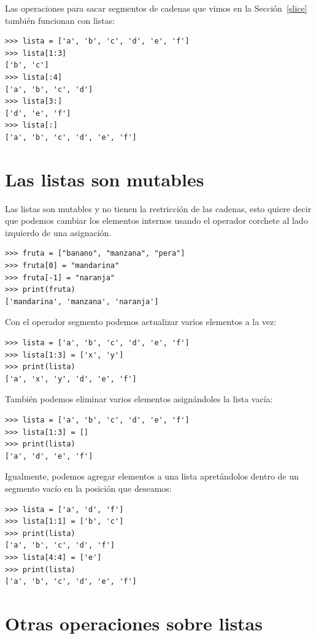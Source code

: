  

Las operaciones para sacar segmentos de cadenas que vimos en la Sección~\ref{slice}
también funcionan con listas:
\begin{verbatim}
>>> lista = ['a', 'b', 'c', 'd', 'e', 'f']
>>> lista[1:3]
['b', 'c']
>>> lista[:4]
['a', 'b', 'c', 'd']
>>> lista[3:]
['d', 'e', 'f']
>>> lista[:]
['a', 'b', 'c', 'd', 'e', 'f']
\end{verbatim}

\section{Las listas son mutables}

 

Las listas son mutables y no tienen la restricción de las cadenas,
esto quiere decir que podemos cambiar los elementos internos usando
el operador corchete al lado izquierdo de una asignación.
\begin{verbatim}
>>> fruta = ["banano", "manzana", "pera"]
>>> fruta[0] = "mandarina"
>>> fruta[-1] = "naranja"
>>> print(fruta)
['mandarina', 'manzana', 'naranja']
\end{verbatim}
 Con el operador segmento podemos actualizar varios elementos a la
vez:
\begin{verbatim}
>>> lista = ['a', 'b', 'c', 'd', 'e', 'f']
>>> lista[1:3] = ['x', 'y']
>>> print(lista)
['a', 'x', 'y', 'd', 'e', 'f']
\end{verbatim}

También podemos eliminar varios elementos asignándoles la lista vacía:
\begin{verbatim}
>>> lista = ['a', 'b', 'c', 'd', 'e', 'f']
>>> lista[1:3] = []
>>> print(lista)
['a', 'd', 'e', 'f']
\end{verbatim}

Igualmente, podemos agregar elementos a una lista apretándolos dentro
de un segmento vacío en la posición que deseamos:
\begin{verbatim}
>>> lista = ['a', 'd', 'f']
>>> lista[1:1] = ['b', 'c']
>>> print(lista)
['a', 'b', 'c', 'd', 'f']
>>> lista[4:4] = ['e']
>>> print(lista)
['a', 'b', 'c', 'd', 'e', 'f']
\end{verbatim}

\section{Otras operaciones sobre listas}

